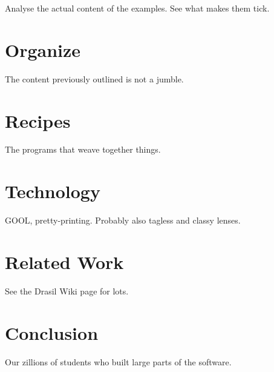 \documentclass[english,submission]{programming}
\begin{document}
Analyse the actual content of the examples. See what makes them tick.

\section{Organize}
\label{sec:organize}

The content previously outlined is not a jumble.

\section{Recipes}
\label{sec:recipes}

The programs that weave together things.

\section{Technology}
\label{sec:tech}

GOOL, pretty-printing. Probably also tagless and classy lenses.

\section{Related Work}
\label{sec:relwork}

See the Drasil Wiki page for lots.

\section{Conclusion}
\label{sec:conc}

\acks
Our zillions of students who built large parts of the software.

\end{document}
